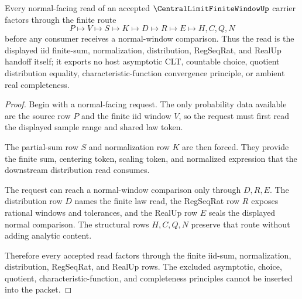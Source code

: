 \begin{theorem}\label{thm:central-limit-finite-window-normal-handoff}
Every normal-facing read of an accepted $\CentralLimitFiniteWindowUp$ carrier factors through the finite route
$$
P\longmapsto V\longmapsto S\longmapsto K\longmapsto D\longmapsto R\longmapsto E\longmapsto H,C,Q,N
$$
before any consumer receives a normal-window comparison. Thus the read is the displayed iid finite-sum, normalization, distribution, RegSeqRat, and RealUp handoff itself; it exports no host asymptotic CLT, countable choice, quotient distribution equality, characteristic-function convergence principle, or ambient real completeness.
\end{theorem}
\begin{proof}
Begin with a normal-facing request. The only probability data available are the source row $P$ and the finite iid window $V$, so the request must first read the displayed sample range and shared law token.

The partial-sum row $S$ and normalization row $K$ are then forced. They provide the finite sum, centering token, scaling token, and normalized expression that the downstream distribution read consumes.

The request can reach a normal-window comparison only through $D,R,E$. The distribution row $D$ names the finite law read, the RegSeqRat row $R$ exposes rational windows and tolerances, and the RealUp row $E$ seals the displayed normal comparison. The structural rows $H,C,Q,N$ preserve that route without adding analytic content.

Therefore every accepted read factors through the finite iid-sum, normalization, distribution, RegSeqRat, and RealUp rows. The excluded asymptotic, choice, quotient, characteristic-function, and completeness principles cannot be inserted into the packet.
\end{proof}


